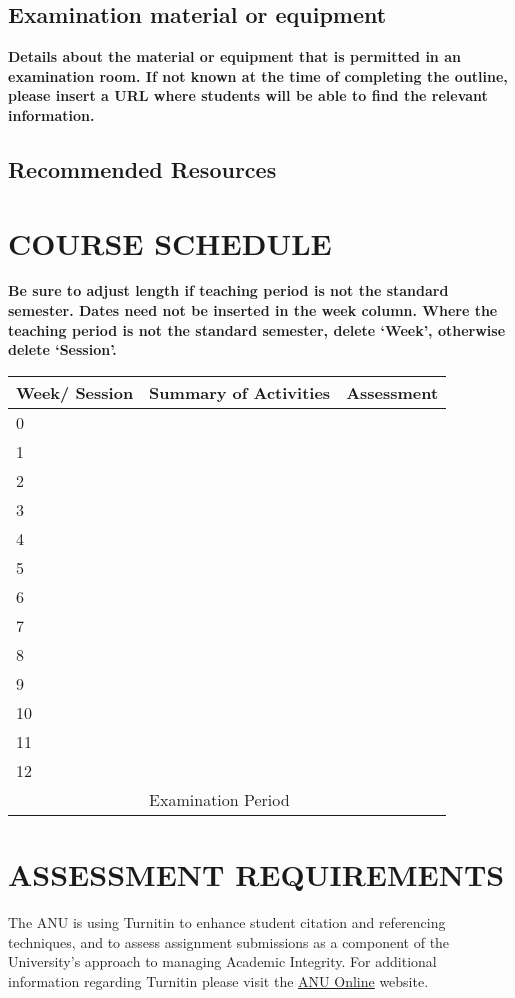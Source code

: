 \documentclass[11pt]{article}
\begin{document}
\subsection*{Examination material or equipment}
{\bfseries\color{red}Details about the material or equipment that is permitted in an examination room. If not known at the time of completing the outline, please insert a URL where students will be able to find the relevant information.}

\subsection*{Recommended Resources}

\section*{COURSE SCHEDULE}
{\bfseries\color{red}Be sure to adjust length if teaching period is not the standard semester. Dates need not be inserted in the week column. Where the teaching period is not the standard semester, delete ‘Week’, otherwise delete ‘Session’.}

\begin{tabular}{| p{1.6cm} | p{6cm} | p{6cm} |}
	\hline
	\textbf{Week/ Session} &\textbf{Summary of Activities} & \textbf{Assessment} \\ \hline
	0 & & \\ \hline
	1 & & \\ \hline
	2 & & \\ \hline
	3 & & \\ \hline
	4 & & \\ \hline
	5 & & \\ \hline
	6 & & \\ \hline
	7 & & \\ \hline	
	8 & & \\ \hline
	9 & & \\ \hline
	10 & & \\ \hline
	11 & & \\ \hline
	12 & & \\ \hline
	& Examination Period & \\ \hline
\end{tabular}

\section*{ASSESSMENT REQUIREMENTS}
The ANU is using Turnitin to enhance student citation and referencing techniques, and to assess assignment submissions as a component of the University's approach to managing Academic Integrity. For additional information regarding Turnitin please visit the \href{https://services.anu.edu.au/information-technology/software-systems/turnitin}{\color{blue} ANU Online} website. \\
\end{document}
